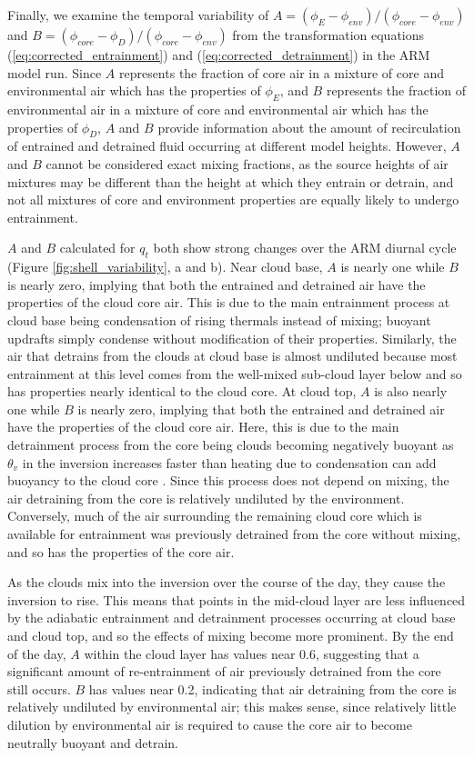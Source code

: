 \documentclass[12pt]{article}
\begin{document}
Finally, we examine the temporal variability of 
$A = (\phi_E - \phi_{env})/(\phi_{core} - \phi_{env})$ and
$B = (\phi_{core} - \phi_D)/(\phi_{core} - \phi_{env})$ from the 
transformation equations (\ref{eq:corrected_entrainment}) and 
(\ref{eq:corrected_detrainment}) in the ARM model run.  Since $A$ 
represents the fraction of core air in a mixture of core and environmental 
air which has the properties of $\phi_E$, and $B$ represents the fraction 
of environmental air in a mixture of core and environmental air which has 
the properties of $\phi_D$, $A$ and $B$ provide information about the 
amount of recirculation of entrained and detrained fluid occurring at 
different model heights.  However, $A$ and $B$ cannot be considered exact 
mixing fractions, as the source heights of air mixtures may be different 
than the height at which they entrain or detrain, and not all mixtures 
of core and environment properties are equally likely to undergo 
entrainment.

$A$ and $B$ calculated for $q_t$ both show strong changes over the ARM 
diurnal cycle (Figure \ref{fig:shell_variability}, a and b).  Near cloud 
base, $A$ is nearly one while $B$ is nearly zero, implying that both the 
entrained and detrained air have the properties of the cloud core air.  
This is due to the main entrainment process at cloud base being 
condensation of rising thermals instead of mixing; buoyant updrafts 
simply condense without modification of their properties.  Similarly, 
the air that detrains from the clouds at cloud base is almost undiluted 
because most entrainment at this level comes from the well-mixed 
sub-cloud layer below and so has properties nearly identical to the 
cloud core.  At cloud top, $A$ is also nearly one while $B$ is nearly 
zero, implying that both the entrained and detrained air have the 
properties of the cloud core air.  Here, this is due to the main 
detrainment process from the core being clouds becoming negatively 
buoyant as $\theta_v$ in the inversion increases faster than heating 
due to condensation can add buoyancy to the cloud core \citep{Wu2009}.  
Since this process does not depend on mixing, the air detraining from 
the core is relatively undiluted by the environment.  Conversely, much 
of the air surrounding the remaining cloud core which is available for 
entrainment was previously detrained from the core without mixing, and 
so has the properties of the core air.

As the clouds mix into the inversion over the course of the day, they 
cause the inversion to rise.  This means that points in the mid-cloud 
layer are less influenced by the adiabatic entrainment and detrainment 
processes occurring at cloud base and cloud top, and so the effects of 
mixing become more prominent.  By the end of the day, $A$ within the 
cloud layer has values near 0.6, suggesting that a significant amount 
of re-entrainment of air previously detrained from the core still occurs.  
$B$ has values near 0.2, indicating that air detraining from the core 
is relatively undiluted by environmental air; this makes sense, since 
relatively little dilution by environmental air is required to cause 
the core air to become neutrally buoyant and detrain.
\end{document}
